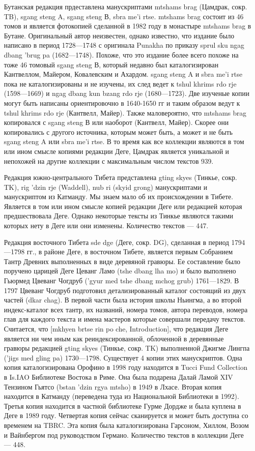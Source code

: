 Бутанская редакция прдеставлена манускриптами mtshams brag (Цамдрак, сокр. TB), sgang steng A, sgang steng В, sbra me'i rtse. mtshams brag состоит из 46 томов и является фотокопией сделанной в 1982 году в монастыре mtshams brag в Бутане. Оригинальный автор неизвестен, однако известно, что издание было написано в период 1728—1748 с оригинала Punakha по приказу sprul sku ngag dbang 'brug pa (1682—1748). Похоже, что это издание более всего похоже на тоже 46 томовый sgang steng В, который недавно был каталогизирован Кантвеллом, Майером, Ковалевским и Ахардом. sgang steng A и sbra me'i rtse пока не каталогизированы и не изучены, их след ведет к tshul khrims rdo rje (1598—1669) и ngag dbang kun bzang rdo rje (1680—1723). Две изученые копии могут быть написаны ориентировочно в 1640-1650 гг и таким образом ведут к tshul khrims rdo rje (Кантвелл, Майер). Также маловероятно, что mtshams brag копировался с sgang steng В или наоборот (Кантвелл, Майер). Скорее они копировались с другого источника, которым может быть, а может и не быть sgang steng A или sbra me'i rtse. В то время как все коллекции являются в том или ином смысле копиями редакции Деге, Цамдрак является уникальной и непохожей на другие коллекции с максимальным числом текстов 939.

Редакция южно-центрального Тибета представлена gting skyes (Тинкье, сокр. TK), rig 'dzin rje (Waddell), nub ri (skyid grong) манускриптами и манускриптом из Катманду. Мы знаем мало об их происхождении в Тибете. Является в том или  ином смысле копией редакции Деге или редакцией которая предшествовала Деге. Однако некоторые тексты из Тинкье являются такими которых нету в Деге или они изменены. Количество текстов — 447.

Редакция восточного Тибета sde dge (Деге, сокр. DG), сделанная в период 1794—1798 гг., в районе Деге, в восточном Тибете, является первым Собранием Тантр Древних выполненных в виде деревяной гравюры. Ее составление было поручено царицей Деге Цеванг Ламо (tshe dbang lha mo) и было выполнено Гьюрмед Цвеванг Чогдруб ('gyur med tshe dbang mchog grub) 1761—1829. В 1797 Цвеванг Чогдруб подготовил детализированный каталог состоящий из двух частей (dkar chag). В первой части была история школы Ньингма, а во второй индекс-каталог всех тантр, их названий, номера томов, автора переводов, номера глав для каждого текста и имена мастеров которые совершали передачу текстов. Считается, что [mkhyen brtse rin po che, Introduction], что редакция Деге является ни чем иным как реиндексированной, облоченной в деревянные гравюры редакцией gting skyes (Тинкье, сокр. TK) выполненной Джигме Лингпа ('jigs med gling pa) 1730—1798. Существует 4 копии этих манускриптов. Одна копия каталогизирована Орофино в 1998 году находится в Tucci Fund Collection в Is.IAO Библиотеке Востока в Риме. Она была подарена Далай Ламой XIV Тензином Гьятсо (bstan 'dzin rgya mtsho) в 1949 в Лхасе. Вторая копия находится в Катманду (переведена туда из Национальной Библиотеки в 1992). Третья копия находится в частной библиотеке Гурме Дордже и была куплена в Деге в 1989 году. Четвертая копия сейчас сканируется и может быть доступна со временем на TBRC. Эта копия была каталогизирована Гарсоном, Хиллом, Возом и Вайнбергом под руководством Германо. Количество текстов в коллекции Деге — 448.

